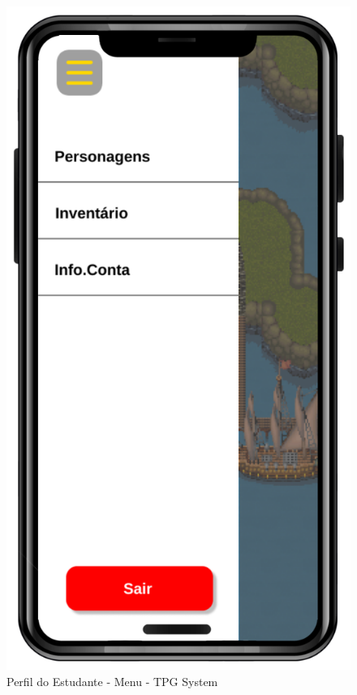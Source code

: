 \begin{figure}[!h]
\centering
\caption{Perfil do Estudante - Menu - TPG System}%
\label{fig:Tela14}
\includegraphics[scale=0.20]{Illustrations/Tela14.png}
\end{figure}

